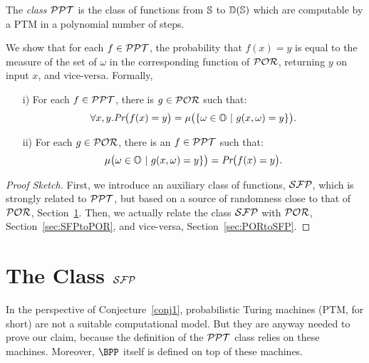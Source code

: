 \begin{defn}
The \emph{class $\mathcal{PPT}$} is the class of functions
from $\mathbb{S}$ to $\mathbb D(\mathbb{S})$
which are computable by a PTM in a polynomial
number of steps.
\end{defn}
%
%
\noindent
We show that for each $f\in \mathcal{PPT}$,
the probability that $f(x)=y$ is equal to the measure
of the set of $\omega$ in the
corresponding function of $\mathcal{POR}$,
returning $y$ on input $x$, and vice-versa.
%
Formally,
%
\begin{conj}\label{conj1}
\begin{enumerate}
\itemsep0em
\item[i)] For each $f\in \mathcal{PPT}$, there is $g \in \mathcal{POR}$
such that:
$$
\forall x, y. \emph{Pr}\big(f(x)=y\big) = \mu\big(\{
\omega \in \mathbb{O} \ | \ g(x,\omega)=y\}\big).
$$

\item[ii)] For each $g\in \mathcal{POR}$, there is an $f\in \mathcal{PPT}$
such that:
$$
\mu\big(\omega \in \mathbb{O} \ | \ g(x,\omega) = y\}\big)
= \emph{Pr}\big( f(x) =y \big).
$$
\end{enumerate}
\end{conj}
%
\begin{proof}[Proof Sketch]
First, we introduce an auxiliary class of functions,
$\mathcal{SFP}$, which is strongly related to $\mathcal{PPT}$,
but based on a source of randomness close
to that of $\mathcal{POR}$, Section~\ref{sec:SFP}.
%
Then, we actually relate the class $\mathcal{SFP}$
with $\mathcal{POR}$, Section~\ref{sec:SFPtoPOR},
and vice-versa, Section~\ref{sec:PORtoSFP}.
\end{proof}













\section{The Class $\mathcal{SFP}$}\label{sec:SFP}
In the perspective of Conjecture~\ref{conj1},
probabilistic Turing machines (PTM, for short)
are not a suitable computational model.
But they are anyway needed to prove our claim,
because the definition of the $\mathcal{PPT}$ class
relies on these machines. Moreover,
$\BPP$ itself is defined on top of these machines.




